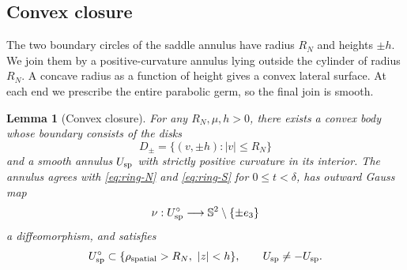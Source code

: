 \documentclass[11pt]{amsart}
\newtheorem{lemma}[theorem]{Lemma}
\theoremstyle{definition}
\theoremstyle{remark}
\numberwithin{equation}{section}
\begin{document}
\subsection{Convex closure}\label{sec:model-convex}
The two boundary circles of the saddle annulus have radius $R_N$
and heights $\pm h$. We join them by a positive-curvature annulus
lying outside the cylinder of radius $R_N$. A concave radius as a
function of height gives a convex lateral surface. At each end we
prescribe the entire parabolic germ, so the final join is smooth.

\begin{lemma}[Convex closure]\label{lem:convex}
For any $R_N,\mu,h>0$, there exists a convex body whose boundary
consists of the disks
\[
 D_\pm=\{(v,\pm h):|v|\le R_N\}
\]
and a smooth annulus $U_{\rm sp}$ with strictly positive curvature
in its interior. The annulus agrees with \eqref{eq:ring-N} and
\eqref{eq:ring-S} for $0\le t<\delta$, has outward Gauss map
\begin{equation}\label{eq:convex-gauss}
 \nu:U_{\rm sp}^{\circ}\longrightarrow
            \mathbb S^2\setminus\{\pm e_3\}
\end{equation}
a diffeomorphism, and satisfies
\begin{equation}\label{eq:convex-exterior}
 U_{\rm sp}^{\circ}\subset
      \{\rho_{\rm spatial}>R_N,\ |z|<h\},
 \qquad U_{\rm sp}\ne -U_{\rm sp}.
\end{equation}
\end{lemma}
\end{document}
